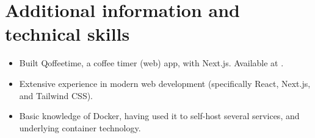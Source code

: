 \documentclass[10pt]{article}
\begin{document}
\section{Additional information and technical skills}
\label{sec:other}

\begin{itemize}
    \item Built Qoffeetime, a coffee timer (web) app, with Next.js. Available at .
    \item Extensive experience in modern web development (specifically React, Next.js, and Tailwind CSS).
    \item Basic knowledge of Docker, having used it to self-host several services, and underlying container technology.
\end{itemize}
\end{document}
